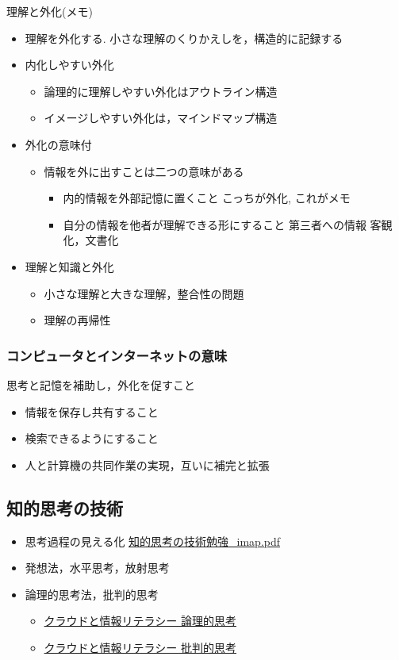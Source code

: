 \documentclass[dvipdfmx,11pat]{jarticle}
\begin{document}
理解と外化(メモ)  
\begin{itemize}
\item 理解を外化する. 小さな理解のくりかえしを，構造的に記録する
\item 内化しやすい外化
\begin{itemize}
\item 論理的に理解しやすい外化はアウトライン構造
\item イメージしやすい外化は，マインドマップ構造
\end{itemize}
\item 外化の意味付
\begin{itemize}
\item 情報を外に出すことは二つの意味がある
\begin{itemize}
\item 内的情報を外部記憶に置くこと
こっちが外化, これがメモ
\item 自分の情報を他者が理解できる形にすること
第三者への情報 客観化，文書化
\end{itemize}
\end{itemize}
\item 理解と知識と外化
\begin{itemize}
\item 小さな理解と大きな理解，整合性の問題
\item 理解の再帰性
\end{itemize}
\end{itemize}
\subsubsection{コンピュータとインターネットの意味}
\label{sec:orgcec3255}
思考と記憶を補助し，外化を促すこと
\begin{itemize}
\item 情報を保存し共有すること
\item 検索できるようにすること
\item 人と計算機の共同作業の実現，互いに補完と拡張
\end{itemize}
\subsection{知的思考の技術}
\label{sec:org2caa65f}
\begin{itemize}
\item 思考過程の見える化 \href{https://masayuki054.github.io/tools\_for\_thinking\_and\_memo/i\_maps/\%E7\%9F\%A5\%E7\%9A\%84\%E6\%80\%9D\%E8\%80\%83\%E3\%81\%AE\%E6\%8A\%80\%E8\%A1\%93\%E5\%8B\%89\%E5\%BC\%B7\_imap.pdf}{知的思考の技術勉強\_imap.pdf}
\item 発想法，水平思考，放射思考
\item 論理的思考法，批判的思考
\begin{itemize}
\item \href{https://masayuki054.github.io/cloud\_and\_information\_literacy/docs/logical-thinking.html}{クラウドと情報リテラシー 論理的思考}
\item \href{https://masayuki054.github.io/cloud\_and\_information\_literacy/docs/critical\_thinking.html}{クラウドと情報リテラシー 批判的思考}
\end{itemize}
\end{itemize}
\end{document}
